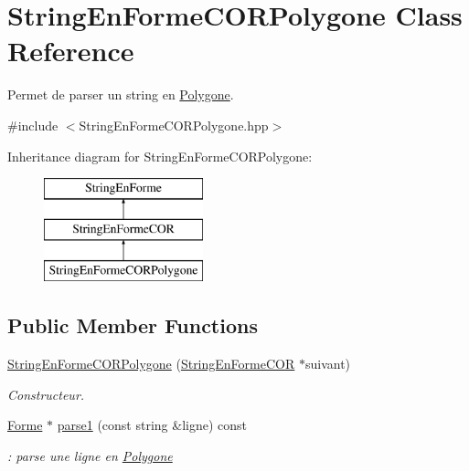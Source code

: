 \hypertarget{class_string_en_forme_c_o_r_polygone}{}\section{String\+En\+Forme\+C\+O\+R\+Polygone Class Reference}
\label{class_string_en_forme_c_o_r_polygone}


Permet de parser un string en \mbox{\hyperlink{class_polygone}{Polygone}}.  




{\ttfamily \#include $<$String\+En\+Forme\+C\+O\+R\+Polygone.\+hpp$>$}

Inheritance diagram for String\+En\+Forme\+C\+O\+R\+Polygone\+:\begin{figure}[H]
\begin{center}
\leavevmode
\includegraphics[height=3.000000cm]{class_string_en_forme_c_o_r_polygone}
\end{center}
\end{figure}
\subsection*{Public Member Functions}
\begin{DoxyCompactItemize}
\item 
\mbox{\hyperlink{class_string_en_forme_c_o_r_polygone_ad6bc42ef8a0cae88778fb316e5f75430}{String\+En\+Forme\+C\+O\+R\+Polygone}} (\mbox{\hyperlink{class_string_en_forme_c_o_r}{String\+En\+Forme\+C\+OR}} $\ast$suivant)
\begin{DoxyCompactList}\small\item\em Constructeur. \end{DoxyCompactList}\item 
\mbox{\hyperlink{class_forme}{Forme}} $\ast$ \mbox{\hyperlink{class_string_en_forme_c_o_r_polygone_a55ec921cc3af81bbe77737819c5449b7}{parse1}} (const string \&ligne) const
\begin{DoxyCompactList}\small\item\em \+: parse une ligne en \mbox{\hyperlink{class_polygone}{Polygone}} \end{DoxyCompactList}\end{DoxyCompactItemize}


